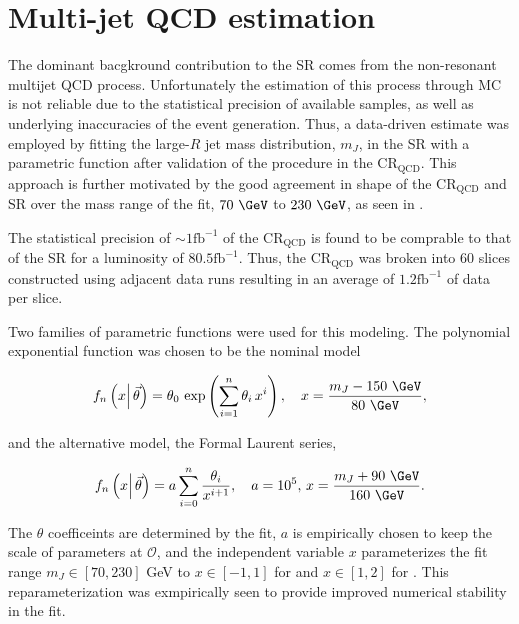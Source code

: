 \section{Multi-jet QCD estimation} \label{sec:background:qcd}

The dominant bacgkround contribution to the SR comes from the non-resonant
multijet QCD process. Unfortunately the estimation of this process through MC
is not reliable due to the statistical precision of available samples, as well
as underlying inaccuracies of the event generation.  Thus, a data-driven
estimate was employed by fitting the large-$R$ jet mass distribution, $m_{J}$,
in the SR with a parametric function after validation of the procedure in the
$\text{CR}_{\text{QCD}}$.  This approach is further motivated by the good
agreement in shape of the $\text{CR}_{\text{QCD}}$ and SR over the mass range
of the fit, $70~\GeV$ to $230~\GeV$, as seen in .

The statistical precision of $\sim 1 \text{fb}^{-1}$ of the
$\text{CR}_{\text{QCD}}$ is found to be comprable to that of the SR for a
luminosity of $80.5 \text{fb}^{-1}$.  Thus, the $\text{CR}_{\text{QCD}}$ was
broken into 60 slices constructed using adjacent data runs resulting in an
average of $1.2 \text{fb}^{-1}$ of data per slice.

Two families of parametric functions were used for this modeling.  The
polynomial exponential function was chosen to be the nominal model

\begin{equation}
\label{sec:background:polynomial}
f_{n} \left(x \middle|\,\vec{\theta}\right) = \theta_{0}\, \exp\left(\sum_{i=1}^{n} \theta_{i}\,x^{i}\right), \quad x = \frac{m_{J} - 150~\GeV}{80~\GeV},
\end{equation}

and the alternative model, the Formal Laurent series,

\begin{equation}
\label{sec:background:laurent}
f_{n} \left(x \middle|\,\vec{\theta}\right) = a \sum_{i=0}^{n} \frac{\theta_{i}}{x^{i+1}}, \quad a=10^{5},\,x = \frac{m_{J} + 90~\GeV}{160~\GeV}.
\end{equation}

The $\theta$ coefficeints are determined by the fit, $a$ is empirically chosen
to keep the scale of parameters at $\mathcal{O}$, and the independent variable
$x$ parameterizes the fit range $m_{J}\in[70,230]$ GeV to $x\in[-1,1]$ for
 and $x\in[1,2]$ for .
This reparameterization was exmpirically seen to provide improved numerical
stability in the fit.


